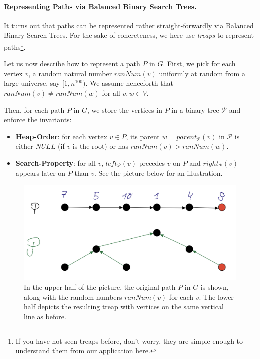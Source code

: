 \paragraph{Representing Paths via Balanced Binary Search Trees.} It turns out that paths can be represented rather straight-forwardly via Balanced Binary Search Trees. For the sake of concreteness, we here use \emph{treaps} to represent paths\footnote{If you have not seen treaps before, don't worry, they are simple enough to understand them from our application here. }. 

Let us now describe how to represent a path $P$ in $G$. First, we pick for each vertex $v$, a random natural number $ranNum(v)$ uniformly at random from a large universe, say $[1, n^{100})$. We assume henceforth that $ranNum(v) \neq ranNum(w)$ for all $v,w\in V$.

Then, for each path $P$ in $G$, we store the vertices in $P$ in a binary tree $\mathcal{P}$ and enforce the invariants:
\begin{itemize}
    \item \textbf{Heap-Order}: for each vertex $v \in P$, its parent $w = parent_{\mathcal{P}}(v)$ in $\mathcal{P}$ is either $NULL$ (if $v$ is the root) or has $ranNum(v) > ranNum(w)$.
    \item \textbf{Search-Property}: for all $v$, $left_{\mathcal{P}}(v)$ precedes $v$ on $P$ and $right_{\mathcal{P}}(v)$ appears later on $P$ than $v$. See the picture below for an illustration.
\end{itemize}

\begin{figure}[!ht]
    \centering
    \includegraphics[scale=0.2]{./fig/PathRepTreap_lectureDynamicTree.jpeg}
    \caption{In the upper half of the picture, the original path $P$ in $G$ is shown, along with the random numbers $ranNum(v)$ for each $v$. The lower half depicts the resulting treap with vertices on the same vertical line as before.}
    \label{fig:my_label}
\end{figure}

